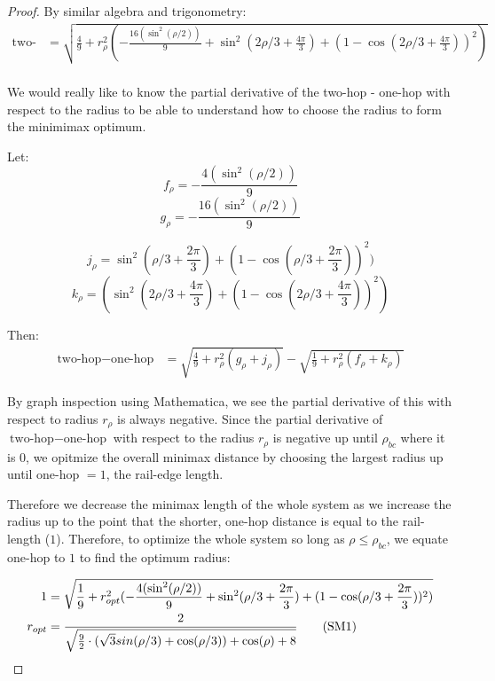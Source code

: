 \documentclass[review]{siamonline1116}
\newcommand\numberthis{\addtocounter{equation}{1}\tag{\theequation}}
\begin{document}
\begin{proof}
By similar algebra and trigonometry:
\begin{align*}
  \text{two-hop}  &= \sqrt{\frac{4}{9} + r_{\rho}^2 (-\frac{16 (\sin^2( \rho / 2))}{9} + \sin^2(2\rho/3 + \frac{4\pi}{3})  + (1 - \cos(2\rho/3 + \frac{4\pi}{3}))^2)} \\
\end{align*}

We would really like to know the partial derivative of the two-hop - one-hop with respect
to the radius to be able to understand how to choose the radius to form the minimimax optimum.

Let:
\begin{equation*}
  f_{\rho} = -\frac{4 (\sin^2( \rho / 2))}{9}
  \end{equation*}
\begin{equation*}
  g_{\rho} = -\frac{16 (\sin^2( \rho / 2))}{9} 
\end{equation*}

\begin{equation*}
  j_{\rho} = \sin^2(\rho/3+ \frac{2\pi}{3})  + (1 - \cos(\rho/3 + \frac{2\pi}{3}))^2)
\end{equation*}
\begin{equation*}
  k_{\rho} = (\sin^2(2\rho/3 + \frac{4\pi}{3})  + (1 - \cos(2\rho/3 + \frac{4\pi}{3}))^2)
\end{equation*}

Then:
\begin{align*}
  \text{two-hop} - \text{one-hop}  &= \sqrt{\frac{4}{9}  + r_{\rho}^2(g_{\rho}+ j_{\rho})}
  - \sqrt{\frac{1}{9} +r_{\rho}^2(f_{\rho}+k_{\rho}) }
\end{align*}



By graph inspection using Mathematica, we see the partial derivative of this with respect to
radius $r_{\rho}$ is always negative.
Since the partial derivative of $\text{two-hop} - \text{one-hop}$ with respect to the
radius $r_{\rho}$ is negative up until $\rho_{bc}$ where it is $0$, 
we opitmize the overall minimax distance by choosing the largest radius
up until one-hop $= 1$, the rail-edge length.

Therefore we decrease the minimax length
of the whole system as we increase the radius
up to the point that the shorter, one-hop distance is equal to the rail-length ($1$).
Therefore, to optimize the whole system so long as $\rho \leq \rho_{bc}$,
we equate one-hop to $1$ to find the optimum radius:


\begin{align*}
  1 &=  \sqrt{\frac{1}{9}  + r_{opt}^2(-\frac{4 (\sin^2( \rho / 2))}{9} + \sin^2(\rho/3+ \frac{2\pi}{3})  + (1 - \cos(\rho/3 + \frac{2\pi}{3}))^2)} \\
  r_{opt} &= \frac{2}{\sqrt{\frac{9}{2} \cdot ( \sqrt{3} sin(\rho/3) + \cos(\rho/3)) + \cos(\rho)+ 8 }} \numberthis  \label{eqrhoopt} \\
\end{align*}


\end{proof}
\end{document}

